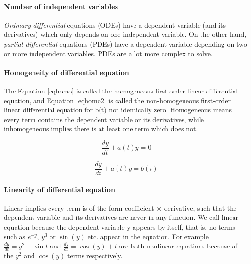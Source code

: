 \documentclass[11pt, letterpaper, english]{article}
\begin{document}
    \paragraph{Number of independent variables}
    
    \par{\textit{Ordinary differential} equations (ODEs) have a dependent variable (and its derivatives) which only depends on one independent variable. On the other hand, \textit{partial differential} equations (PDEs) have a dependent variable depending on two or more independent variables. PDEs are a lot more complex to solve.}
    
    \paragraph{Homogeneity of differential equation}
    
    \par{The Equation \ref{eqhomo} is called the homogeneous first-order linear differential equation, and Equation \ref{eqhomo2} is called the non-homogeneous first-order linear differential equation for b(t) not identically zero. Homogeneous means every term contains the dependent variable or its derivatives, while inhomogeneous implies there is at least one term which does not.}
    
    \begin{equation}
        \frac{d y}{d t}+a(t) y =0
        \label{eqhomo}
    \end{equation}
    
    \begin{equation}
        \frac{d y}{d t}+a(t) y =b(t)
        \label{eqhomo2}
    \end{equation}

    
    \paragraph{Linearity of differential equation}
    
    \par{Linear implies every term is of the form coefficient × derivative, such that the dependent variable and its derivatives are never in any function. We call linear equation because the dependent variable y appears by itself, that is, no terms such as $e^{-y}$, $y^3$ or $\sin{(y)}$ etc. appear in the equation. For example $\frac{dy}{dt} = y^2 + \sin{t}$ and $\frac{dy}{dt} = \cos{(y)} + t$ are both nonlinear equations because of the $y^2$ and $\cos{(y)}$ terms respectively. \cite{braun_1993}}
\end{document}
